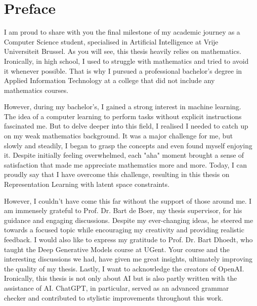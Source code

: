 \chapter*{Preface}

I am proud to share with you the final milestone of my academic journey as a Computer Science student, specialised in Artificial Intelligence at Vrije Universiteit Brussel. As you will see, this thesis heavily relies on mathematics. Ironically, in high school, I used to struggle with mathematics and tried to avoid it whenever possible. That is why I pursued a professional bachelor's degree in Applied Information Technology at a college that did not include any mathematics courses.

However, during my bachelor's, I gained a strong interest in machine learning. The idea of a computer learning to perform tasks without explicit instructions fascinated me. But to delve deeper into this field, I realised I needed to catch up on my weak mathematics background. It was a major challenge for me, but slowly and steadily, I began to grasp the concepts and even found myself enjoying it. Despite initially feeling overwhelmed, each "aha" moment brought a sense of satisfaction that made me appreciate mathematics more and more. Today, I can proudly say that I have overcome this challenge, resulting in this thesis on Representation Learning with latent space constraints.

However, I couldn't have come this far without the support of those around me. I am immensely grateful to Prof. Dr. Bart de Boer, my thesis supervisor, for his guidance and engaging discussions. Despite my ever-changing ideas, he steered me towards a focused topic while encouraging my creativity and providing realistic feedback. I would also like to express my gratitude to Prof. Dr. Bart Dhoedt, who taught the Deep Generative Models course at UGent. Your course and the interesting discussions we had, have given me great insights, ultimately improving the quality of my thesis. Lastly, I want to acknowledge the creators of OpenAI. Ironically, this thesis is not only about AI but is also partly written with the assistance of AI. ChatGPT, in particular, served as an advanced grammar checker and contributed to stylistic improvements throughout this work.








